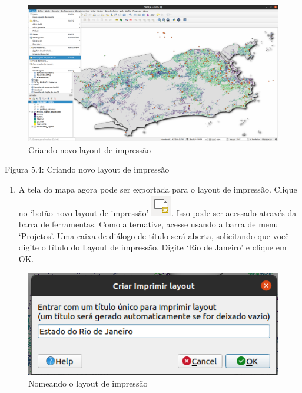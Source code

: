 \documentclass[
]{book}
\providecommand{\tightlist}{%
  \setlength{\itemsep}{0pt}\setlength{\parskip}{0pt}}
\begin{document}
\begin{figure}
\centering
\includegraphics{media/modulo5/new-print-layout.png}
\caption{Criando novo layout de impressão}
\end{figure}

Figura 5.4: Criando novo layout de impressão

\begin{enumerate}
\def\labelenumi{\arabic{enumi}.}
\setcounter{enumi}{1}
\tightlist
\item
  A tela do mapa agora pode ser exportada para o layout de impressão. Clique no `botão novo layout de impressão' \includegraphics{media/modulo5/newprint_composer.png}. Isso pode ser acessado através da barra de ferramentas. Como alternative, acesse usando a barra de menu `Projetos'. Uma caixa de diálogo de título será aberta, solicitando que você digite o título do Layout de impressão. Digite `Rio de Janeiro' e clique em OK.
\end{enumerate}

\begin{figure}
\centering
\includegraphics{media/modulo5/new-print-layout-name.png}
\caption{Nomeando o layout de impressão}
\end{figure}
\end{document}
